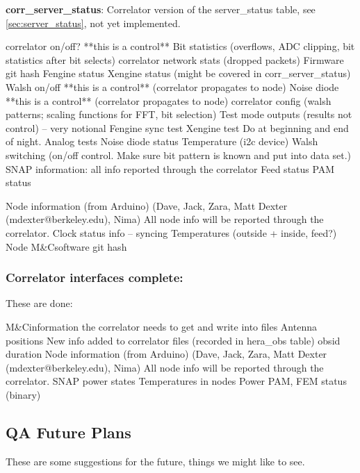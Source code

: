 \documentclass{article}
\newcommand{\mc}{M\&C}
\begin{document}
{\textbf{corr\_server\_status}: Correlator version of the server\_status table, see \ref{sec:server_status}, not yet implemented.

\begin{outline}[enumerate]
	\1 correlator on/off?	**this is a control**
	\1 Bit statistics (overflows, ADC clipping, bit statistics after bit selects)
	\1 correlator network stats (dropped packets)
	\1 Firmware git hash
	\1 Fengine status
	\1 Xengine status (might be covered in corr\_server\_status)
	\1 Walsh on/off	**this is a control** (correlator propagates to node)
	\1 Noise diode	**this is a control** (correlator propagates to node)
	\1 correlator config (walsh patterns; scaling functions for FFT, bit selection)
	\1 Test mode outputs (results not control) -- very notional
		\2 Fengine sync test
		\2 Xengine test
		\2 Do at beginning and end of night.
		\2 Analog tests
			\3 Noise diode status
			\3 Temperature (i2c device)
			\3 Walsh switching (on/off control. Make sure bit pattern is known and put into data set.)
	\1 SNAP information: all info reported through the correlator
		\2 Feed status
		\2 PAM status

	\1 Node information (from Arduino) (Dave, Jack, Zara, Matt Dexter (mdexter@berkeley.edu), Nima) All node info will be reported through the correlator.
		\2 Clock status info -- syncing
		\2 Temperatures (outside + inside, feed?)
		\2 Node \mc software git hash
\end{outline}

\subsubsection{Correlator interfaces complete:}
These are done:
\begin{outline}[enumerate]
	\1 \mc information the correlator needs to get and write into files
		\2 Antenna positions
	\1 New info added to correlator files (recorded in hera\_obs table)
		\2 obsid
		\2 duration
	\1 Node information (from Arduino) (Dave, Jack, Zara, Matt Dexter (mdexter@berkeley.edu), Nima) All node info will be reported through the correlator.
		\2 SNAP power states
		\2 Temperatures in nodes
		\2 Power PAM, FEM status (binary)
\end{outline}

\subsection{QA Future Plans}
\label{sec:qa_future}

These are some suggestions for the future, things we might like to see.

}
\end{document}

